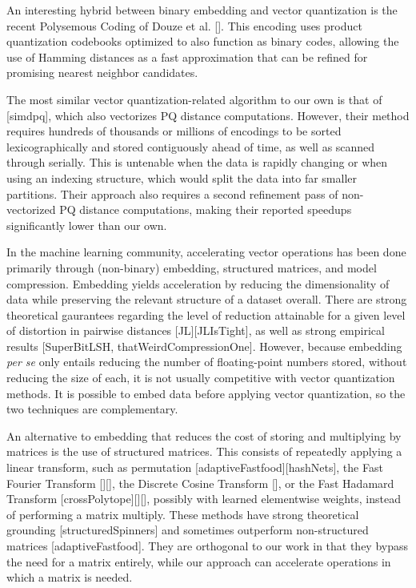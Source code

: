 An interesting hybrid between binary embedding and vector quantization is the recent Polysemous Coding of Douze et al. []. This encoding uses product quantization codebooks optimized to also function as binary codes, allowing the use of Hamming distances as a fast approximation that can be refined for promising nearest neighbor candidates. %

The most similar vector quantization-related algorithm to our own is that of [simdpq], which also vectorizes PQ distance computations. However, their method requires hundreds of thousands or millions of encodings to be sorted lexicographically and stored contiguously ahead of time, as well as scanned through serially. This is untenable when the data is rapidly changing or when using an indexing structure, which would split the data into far smaller partitions. Their approach also requires a second refinement pass of non-vectorized PQ distance computations, making their reported speedups significantly lower than our own.

In the machine learning community, accelerating vector operations has been done primarily through (non-binary) embedding, structured matrices, and model compression. Embedding yields acceleration by reducing the dimensionality of data while preserving the relevant structure of a dataset overall. There are strong theoretical gaurantees regarding the level of reduction attainable for a given level of distortion in pairwise distances [JL][JLIsTight], as well as strong empirical results [SuperBitLSH, thatWeirdCompressionOne]. However, because embedding \textit{per se} only entails reducing the number of floating-point numbers stored, without reducing the size of each, it is not usually competitive with vector quantization methods. It is possible to embed data before applying vector quantization, so the two techniques are complementary.

An alternative to embedding that reduces the cost of storing and multiplying by matrices is the use of structured matrices. This consists of repeatedly applying a linear transform, such as permutation [adaptiveFastfood][hashNets], the Fast Fourier Transform [][], the Discrete Cosine Transform [], or the Fast Hadamard Transform [crossPolytope][][], possibly with learned elementwise weights, instead of performing a matrix multiply. These methods have strong theoretical grounding [structuredSpinners] and sometimes outperform non-structured matrices [adaptiveFastfood]. They are orthogonal to our work in that they bypass the need for a matrix entirely, while our approach can accelerate operations in which a matrix is needed.

